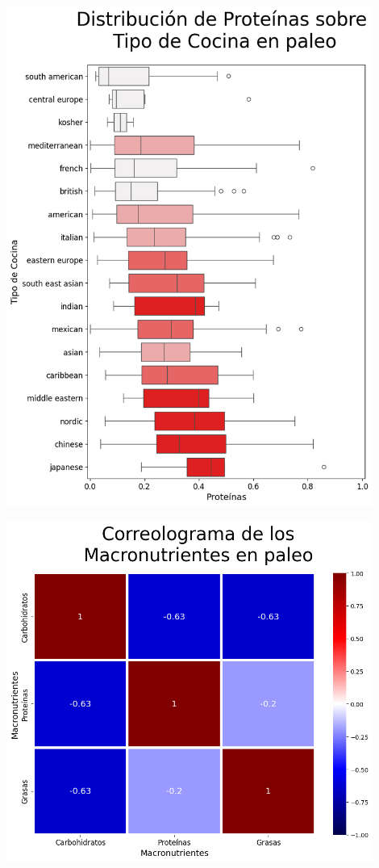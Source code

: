 \documentclass[12pt,a4paper]{article}
\begin{document}
            \begin{center}
                \includegraphics[width=0.90\textwidth]{Resources/2_03_plot_04_2.png}
            \end{center}

            \begin{center}
                \includegraphics[width=0.90\textwidth]{Resources/2_03_plot_04_4.png}
            \end{center}
\end{document}
